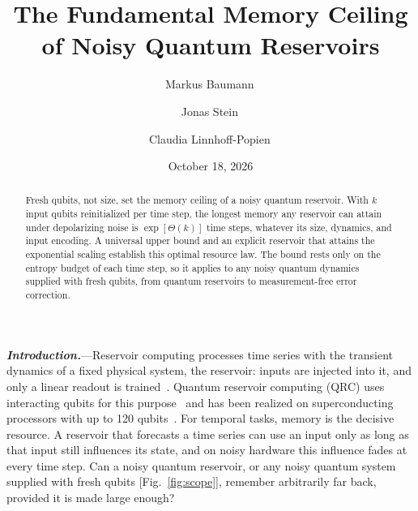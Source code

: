\documentclass[aps,prl,twocolumn,superscriptaddress,floatfix]{revtex4-2}
\theoremstyle{plain}
\newcommand{\runin}[1]{\textit{\textbf{#1}}---}
\begin{document}
\let\SMaddcontentsline\addcontentsline
\renewcommand{\addcontentsline}[3]{}

\title{The Fundamental Memory Ceiling of Noisy Quantum Reservoirs}

\author{Markus Baumann\,}
\author{Jonas Stein\,}
\author{Claudia Linnhoff-Popien\,}

\date{October 18, 2026}

\begin{abstract}
Fresh qubits, not size, set the memory ceiling of a noisy quantum reservoir. With $k$ input qubits reinitialized per time step, the longest memory any reservoir can attain under depolarizing noise is $\exp[\Theta(k)]$ time steps, whatever its size, dynamics, and input encoding. A universal upper bound and an explicit reservoir that attains the exponential scaling establish this optimal resource law. The bound rests only on the entropy budget of each time step, so it applies to any noisy quantum dynamics supplied with fresh qubits, from quantum reservoirs to measurement-free error correction.
\end{abstract}

\maketitle


\runin{Introduction.}Reservoir computing processes time series with the transient dynamics of a fixed physical system, the reservoir: inputs are injected into it, and only a linear readout is trained~\cite{Jaeger2001,Maass2002,JaegerHaas2004,Lukosevicius2009,Tanaka2019}. Quantum reservoir computing (QRC) uses interacting qubits for this purpose~\cite{Fujii2017,Nakajima2019,Mujal2021} and has been realized on superconducting processors with up to 120 qubits~\cite{Chen2020,Suzuki2022,Yasuda2023,Hu2024,Monzani2024}. For temporal tasks, memory is the decisive resource. A reservoir that forecasts a time series can use an input only as long as that input still influences its state, and on noisy hardware this influence fades at every time step. Can a noisy quantum reservoir, or any noisy quantum system supplied with fresh qubits [Fig.~\ref{fig:scope}], remember arbitrarily far back, provided it is made large enough?
\end{document}
